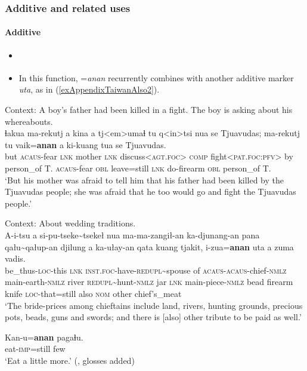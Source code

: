 \subsubsection{Additive and related uses}

\paragraph{Additive}\label{appendixPaiwanAdditive}
\begin{itemize}
	\item \textcite[164]{Egli1990}
	\item In this function, \mbox{=\textit{anan}} recurrently combines with another additive marker \textit{uta}, as in (\ref{exAppendixTaiwanAlso2}).
\end{itemize}

\begin{exe}
	\ex
	Context: A boy’s father had been killed in a fight. The boy is asking about his whereabouts.\\
	\gll ɬakua ma-rekutj a kina a tj<em>umaɬ tu q<in>tsi nua se Tjuavudas; ma-rekutj tu vaik=\textbf{anan} a ki-kuang tua se Tjuavudas.\\
	but \textsc{acaus}-fear \textsc{lnk} mother \textsc{lnk} discuss<\textsc{agt}.\textsc{foc}> \textsc{comp} fight<\textsc{pat}.\textsc{foc}:\textsc{pfv}> by person\_of T. \textsc{acaus}-fear \textsc{obl} leave=still \textsc{lnk} do-firearm \textsc{obl} person\_of T.\\
	\glt \lq But his mother was afraid to tell him that his father had been killed by the Tjuavudas people; she was afraid that he too would go and fight the Tjuavudas people.' \parencite[55]{EarlyWhitehorn2003}

	\ex\label{exAppendixTaiwanAlso2}
	Context: About wedding traditions.\\
	\gll A-i-tsu a si-pu-tseke\sim{}tsekeł nua ma-ma-zangił-an ka-djunang-an pana qału\sim{}qałup-an djilung a ka-ułay-an qata kuang tjakit, i-zua=\textbf{anan} uta a zuma vadis.\\
	be\_thus-\textsc{loc}-this \textsc{lnk} \textsc{inst}.\textsc{foc}-have-\textsc{redupl}\sim{}spouse of \textsc{acaus}-\textsc{acaus}-chief-\textsc{nmlz} main-earth-\textsc{nmlz} river \textsc{redupl}\sim{}hunt-\textsc{nmlz} jar \textsc{lnk} main-piece-\textsc{nmlz} bead firearm knife \textsc{loc}-that=still also \textsc{nom} other chief’s\_meat\\
	\glt \lq The bride-prices among chieftains include land, rivers, hunting grounds, precious pots, beads, guns and swords; and there is [also] other tribute to be paid as well.' \parencite[416]{EarlyWhitehorn2003}

	\ex
	\gll Kan-u=\textbf{anan} pagaɬu.\\
	eat-\textsc{imp}=still few\\
	\glt \lq Eat a little more.' (\cite[115]{Ferrell1982}, glosses added)
\end{exe}

